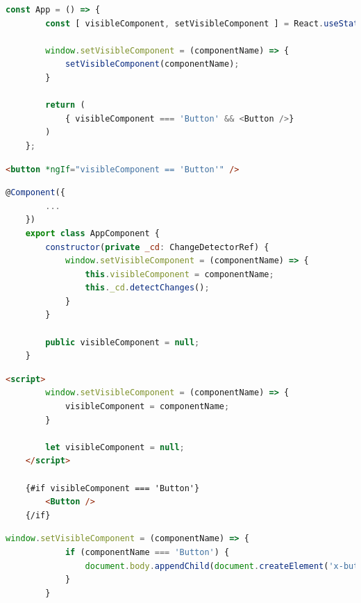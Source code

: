 \begin{lstlisting}[language={JavaScript},caption={The render-on-demand function in ReactJS},label={lst:experimental-setup:react-set-visible}]
	const App = () => {
		const [ visibleComponent, setVisibleComponent ] = React.useState(null);
	
		window.setVisibleComponent = (componentName) => {
			setVisibleComponent(componentName);
		}

		return (
			{ visibleComponent === 'Button' && <Button />}
		)
	};
\end{lstlisting}

\begin{lstlisting}[language={HTML},caption={The render-on-demand function in Angular (HTML file)},label={lst:experimental-setup:angular-set-visible-html}]
	<button *ngIf="visibleComponent == 'Button'" />
\end{lstlisting}

\begin{lstlisting}[language={JavaScript},caption={The render-on-demand function in Angular (JavaScript file)},label={lst:experimental-setup:angular-set-visible-js}]
	@Component({
		...
	})
	export class AppComponent {
		constructor(private _cd: ChangeDetectorRef) {
			window.setVisibleComponent = (componentName) => {
				this.visibleComponent = componentName;
				this._cd.detectChanges();
			}
		}

		public visibleComponent = null;
	}
\end{lstlisting}

\begin{lstlisting}[language={HTML},caption={The render-on-demand function in Svelte},label={lst:experimental-setup:svelte-set-visible}]
	<script>
		window.setVisibleComponent = (componentName) => {
			visibleComponent = componentName;
		}

		let visibleComponent = null;
	</script>

	{#if visibleComponent === 'Button'}
		<Button />
	{/if}
\end{lstlisting}

\begin{lstlisting}[language={JavaScript}, caption={The render-on-demand function in Web Components},label={lst:experimental-setup:web-components-set-visible}]
		window.setVisibleComponent = (componentName) => {
			if (componentName === 'Button') {
				document.body.appendChild(document.createElement('x-button'));
			}
		}
\end{lstlisting}

